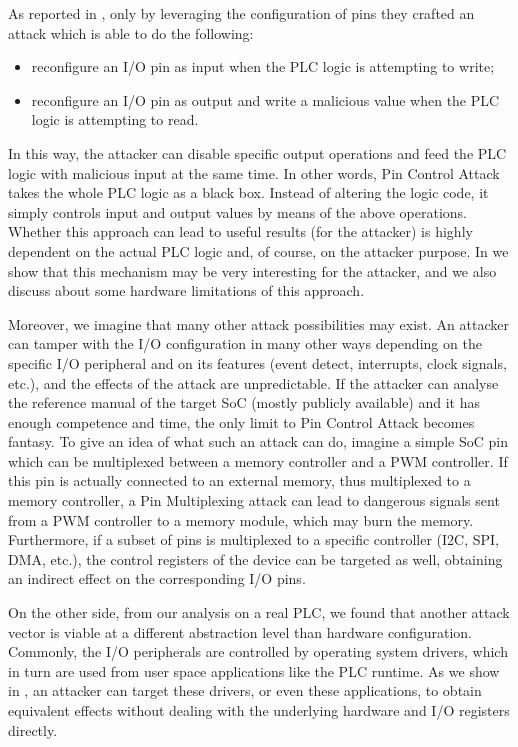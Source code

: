 As reported in \cite{ghostplc}, only by leveraging the configuration of pins they crafted an attack which is able to do the following:
\begin{itemize}
	\item reconfigure an I/O pin as input when the PLC logic is attempting to write;
	\item reconfigure an I/O pin as output and write a malicious value when the PLC logic is attempting to read.
\end{itemize}
In this way, the attacker can disable specific output operations and feed the PLC logic with malicious input at the same time.
In other words, Pin Control Attack takes the whole PLC logic as a black box. Instead of altering the logic code, it simply controls input and output values
by means of the above operations. Whether this approach can lead to useful results (for the attacker) is highly dependent on the actual PLC logic and, of course,
on the attacker purpose. In  we show that this mechanism may be very interesting for the attacker, and we also discuss
about some hardware limitations of this approach.

Moreover, we imagine that many other attack possibilities may exist. An attacker can tamper with the I/O configuration in many other ways depending on the
specific I/O peripheral and on its features (\eg event detect, interrupts, clock signals, etc.), and the effects of the attack are unpredictable.
If the attacker can analyse the reference manual of the target SoC (mostly publicly available) and it has enough competence and time,
the only limit to Pin Control Attack becomes fantasy.
To give an idea of what such an attack can do, imagine a simple SoC pin which can be multiplexed between a memory controller and a PWM controller.
If this pin is actually connected to an external memory, thus multiplexed to a memory controller, a Pin Multiplexing attack can lead to dangerous signals
sent from a PWM controller to a memory module, which may burn the memory. Furthermore, if a subset of pins is multiplexed to a specific controller (\eg I2C, SPI, DMA, etc.),
the control registers of the device can be targeted as well, obtaining an indirect effect on the corresponding I/O pins.

On the other side, from our analysis on a real PLC, we found that another attack vector is viable at a different abstraction level than hardware configuration.
Commonly, the I/O peripherals are controlled by operating system drivers, which in turn are used from user space applications like the PLC runtime.
As we show in , an attacker can target these drivers, or even these applications, to obtain equivalent effects without dealing with
the underlying hardware and I/O registers directly.


